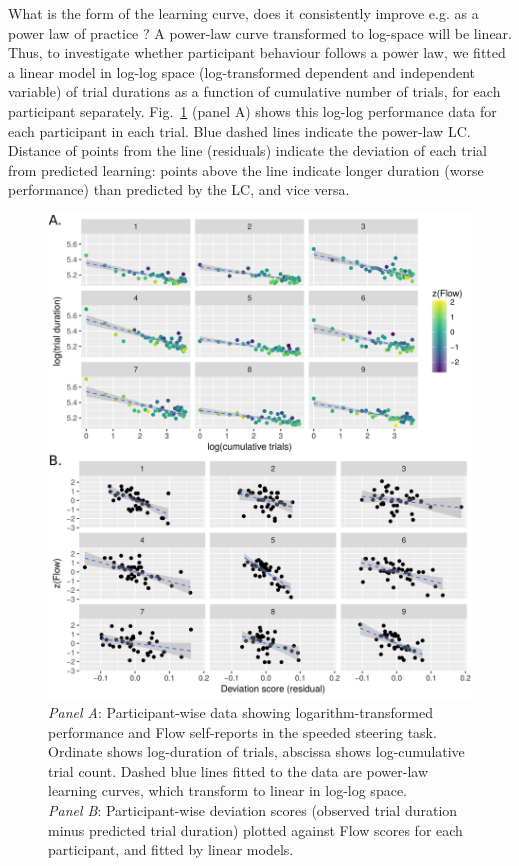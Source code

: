 \documentclass[fleqn,10pt]{wlscirep}
\begin{document}
What is the form of the learning curve, does it consistently improve e.g. as a power law of practice \cite{Newell1982}? A power-law curve transformed to log-space will be linear. Thus, to investigate whether participant behaviour follows a power law, we fitted a linear model in log-log space (log-transformed dependent and independent variable) of trial durations as a function of cumulative number of trials, for each participant separately. Fig.~\ref{fig:flowVperf} (panel A) shows this log-log performance data for each participant in each trial. Blue dashed lines indicate the power-law LC. Distance of points from the line (residuals) indicate the deviation of each trial from predicted learning: points above the line indicate longer duration (worse performance) than predicted by the LC, and vice versa.

\begin{figure}[!p]
	\centering
	\includegraphics[width=\linewidth]{cogcar_main_anon}
	\caption{{\it Panel A}: Participant-wise data showing logarithm-transformed performance and Flow self-reports in the speeded steering task. Ordinate shows log-duration of trials, abscissa shows log-cumulative trial count. Dashed blue lines fitted to the data are power-law learning curves, which transform to linear in log-log space.\\
  {\it Panel B}: Participant-wise deviation scores (observed trial duration minus predicted trial duration) plotted against Flow scores for each participant, and fitted by linear models.}
	\label{fig:flowVperf}
\end{figure}
\end{document}
